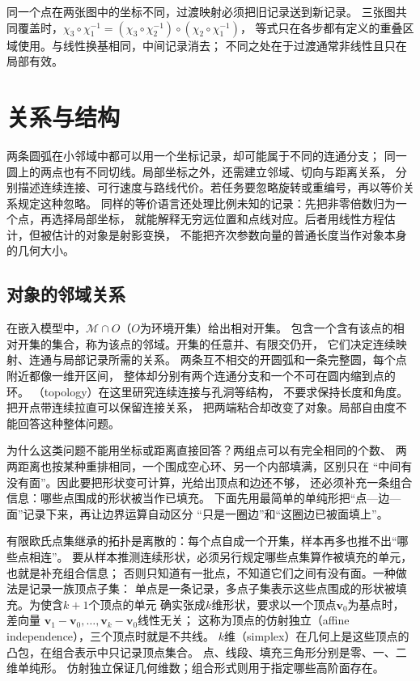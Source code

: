 同一个点在两张图中的坐标不同，过渡映射必须把旧记录送到新记录。
三张图共同覆盖时，$\chi_3\circ\chi_1^{-1}
=(\chi_3\circ\chi_2^{-1})\circ(\chi_2\circ\chi_1^{-1})$，
等式只在各步都有定义的重叠区域使用。与线性换基相同，中间记录消去；
不同之处在于过渡通常非线性且只在局部有效。

\section{关系与结构}
\label{sec:geometry-relations}

两条圆弧在小邻域中都可以用一个坐标记录，却可能属于不同的连通分支；
同一圆上的两点也有不同切线。局部坐标之外，还需建立邻域、切向与距离关系，
分别描述连续连接、可行速度与路线代价。若任务要忽略旋转或重编号，再以等价关系规定这种忽略。
同样的等价语言还处理比例未知的记录：先把非零倍数归为一个点，再选择局部坐标，
就能解释无穷远位置和点线对应。后者用线性方程估计，但被估计的对象是射影变换，
不能把齐次参数向量的普通长度当作对象本身的几何大小。

\subsection{对象的邻域关系}
\label{sec:geometry-neighborhood-relations}
\label{sec:geometry-local-relations-topology}

\label{sec:geometry-neighborhood-topology}

在嵌入模型中，$\mathcal M\cap O$（$O$为环境开集）给出相对开集。
包含一个含有该点的相对开集的集合，称为该点的邻域。开集的任意并、有限交仍开，
它们决定连续映射、连通与局部记录所需的关系。
两条互不相交的开圆弧和一条完整圆，每个点附近都像一维开区间，
整体却分别有两个连通分支和一个不可在圆内缩到点的环。
（topology）在这里研究连续连接与孔洞等结构，
不要求保持长度和角度。把开点带连续拉直可以保留连接关系，
把两端粘合却改变了对象。局部自由度不能回答这种整体问题。

为什么这类问题不能用坐标或距离直接回答？两组点可以有完全相同的个数、
两两距离也按某种重排相同，一个围成空心环、另一个内部填满，区别只在
“中间有没有面”。因此要把形状变可计算，光给出顶点和边还不够，
还必须补充一条组合信息：哪些点围成的形状被当作已填充。
下面先用最简单的单纯形把“点—边—面”记录下来，再让边界运算自动区分
“只是一圈边”和“这圈边已被面填上”。

有限欧氏点集继承的拓扑是离散的：每个点自成一个开集，样本再多也推不出“哪些点相连”。
要从样本推测连续形状，必须另行规定哪些点集算作被填充的单元，也就是补充组合信息；
否则只知道有一批点，不知道它们之间有没有面。一种做法是记录一族顶点子集：
单点是一条记录，多点子集表示这些点围成的形状被填充。为使含$k+1$个顶点的单元
确实张成$k$维形状，要求以一个顶点$\bm v_0$为基点时，差向量
$\bm v_1-\bm v_0,\ldots,\bm v_k-\bm v_0$线性无关；
这称为顶点的仿射独立（affine independence），三个顶点时就是不共线。
$k$维（simplex）在几何上是这些顶点的凸包，在组合表示中只记录顶点集合。
点、线段、填充三角形分别是零、一、二维单纯形。
仿射独立保证几何维数；组合形式则用于指定哪些高阶面存在。


